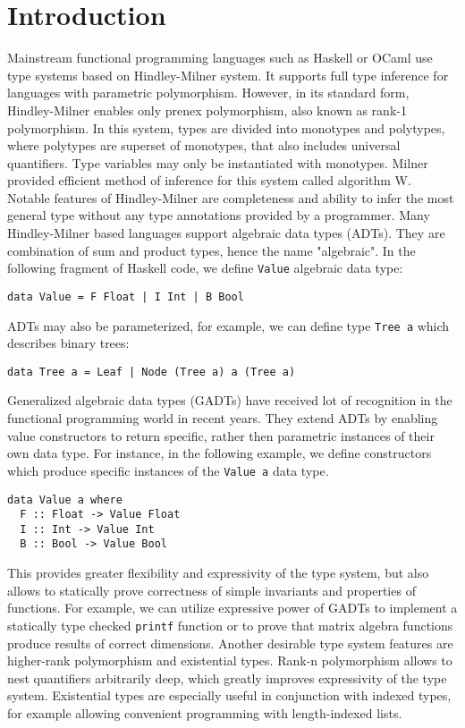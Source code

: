 \documentclass[declaration,shortabstract,english]{iithesis}
\author         {Konrad Werbliński}
\begin{document}

\chapter{Introduction}
Mainstream functional programming languages such as Haskell or OCaml use type systems
based on Hindley-Milner\cite{Hindley,Milner} system.
It supports full type inference for languages with parametric polymorphism.
However, in its standard form, Hindley-Milner enables only prenex polymorphism, also known as
rank-1 polymorphism. In this system, types are divided into monotypes and polytypes,
where polytypes are superset of monotypes, that also includes universal quantifiers.
Type variables may only be instantiated with monotypes. Milner provided efficient
method of inference for this system called algorithm W\cite{Milner}.
Notable features of Hindley-Milner are completeness and ability to infer the most general type
without any type annotations provided by a programmer. Many Hindley-Milner based languages
support algebraic data types (ADTs). They are combination of sum and product types, hence the name "algebraic".
In the following fragment of Haskell code, we define \verb+Value+ algebraic data type:
\begin{verbatim}
data Value = F Float | I Int | B Bool
\end{verbatim}
ADTs may also be parameterized, for example, we can define type \verb+Tree a+ which describes binary trees:
\begin{verbatim}
data Tree a = Leaf | Node (Tree a) a (Tree a)
\end{verbatim}

Generalized algebraic data types (GADTs)\cite{grd,fcpt} have received lot of recognition in
the functional programming world in recent years. They extend ADTs by enabling value constructors to return specific, rather
then parametric instances of their own data type. For instance, in the following example, we define
constructors which produce specific instances of the \verb+Value a+ data type.
\begin{verbatim}
data Value a where
  F :: Float -> Value Float
  I :: Int -> Value Int
  B :: Bool -> Value Bool
\end{verbatim}
This provides greater flexibility and expressivity of the type system,
but also allows to statically prove correctness of simple invariants and properties of functions.
For example, we can utilize expressive power of GADTs to implement a statically type checked \verb+printf+ function
or to prove that matrix algebra functions produce results of correct dimensions. Another desirable type system
features are higher-rank polymorphism and existential types. Rank-n polymorphism allows to nest quantifiers
arbitrarily deep, which greatly improves expressivity of the type system. Existential types are especially useful
in conjunction with indexed types, for example allowing convenient programming with length-indexed lists.
\end{document}
